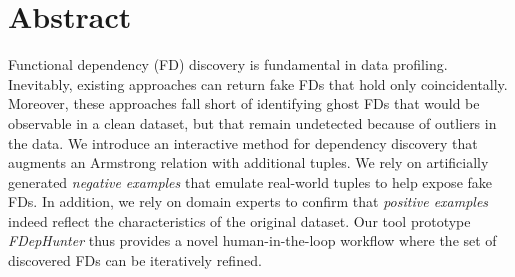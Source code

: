 \section*{Abstract}

Functional dependency (FD) discovery is fundamental in data profiling. Inevitably, existing approaches can return fake FDs that hold only coincidentally. Moreover, these approaches fall short of identifying ghost FDs that would be observable in a clean dataset, but that remain undetected because of outliers in the data.
We introduce an interactive method for dependency discovery that augments an Armstrong relation with additional tuples. 
We rely on
artificially generated \textit{negative examples} that emulate real-world tuples to help expose fake FDs. In addition, we rely on domain experts to confirm that \textit{positive examples} indeed reflect the characteristics of the original dataset. Our tool prototype \emph{FDepHunter} thus provides a novel human-in-the-loop workflow where the set of discovered FDs can be iteratively refined.




